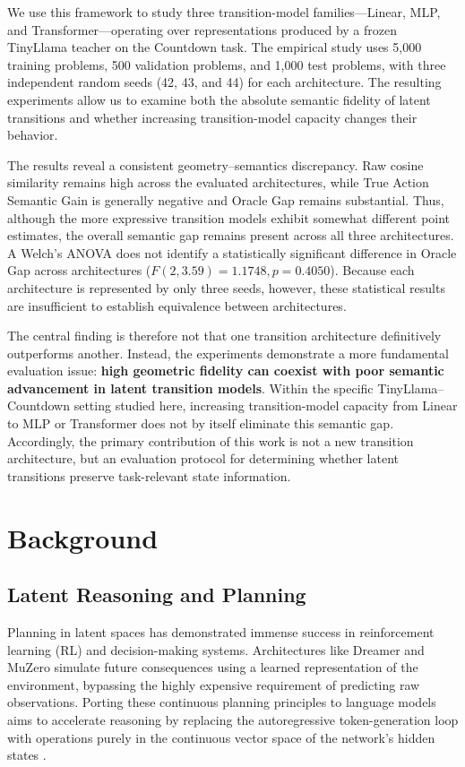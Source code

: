 \documentclass[conference]{IEEEtran}
\begin{document}
We use this framework to study three transition-model families---Linear, MLP, and Transformer---operating over representations produced by a frozen TinyLlama teacher on the Countdown task. The empirical study uses 5,000 training problems, 500 validation problems, and 1,000 test problems, with three independent random seeds (42, 43, and 44) for each architecture. The resulting experiments allow us to examine both the absolute semantic fidelity of latent transitions and whether increasing transition-model capacity changes their behavior.

The results reveal a consistent geometry--semantics discrepancy. Raw cosine similarity remains high across the evaluated architectures, while True Action Semantic Gain is generally negative and Oracle Gap remains substantial. Thus, although the more expressive transition models exhibit somewhat different point estimates, the overall semantic gap remains present across all three architectures. A Welch's ANOVA does not identify a statistically significant difference in Oracle Gap across architectures ($F(2,3.59)=1.1748, p=0.4050$). Because each architecture is represented by only three seeds, however, these statistical results are insufficient to establish equivalence between architectures.

The central finding is therefore not that one transition architecture definitively outperforms another. Instead, the experiments demonstrate a more fundamental evaluation issue: \textbf{high geometric fidelity can coexist with poor semantic advancement in latent transition models}. Within the specific TinyLlama--Countdown setting studied here, increasing transition-model capacity from Linear to MLP or Transformer does not by itself eliminate this semantic gap. Accordingly, the primary contribution of this work is not a new transition architecture, but an evaluation protocol for determining whether latent transitions preserve task-relevant state information.

\section{Background}

\subsection{Latent Reasoning and Planning}
Planning in latent spaces has demonstrated immense success in reinforcement learning (RL) and decision-making systems. Architectures like Dreamer \cite{hafner2020dream} and MuZero \cite{schrittwieser2020mastering} simulate future consequences using a learned representation of the environment, bypassing the highly expensive requirement of predicting raw observations. Porting these continuous planning principles to language models aims to accelerate reasoning by replacing the autoregressive token-generation loop with operations purely in the continuous vector space of the network's hidden states \cite{belrose2023eliciting}.
\end{document}
